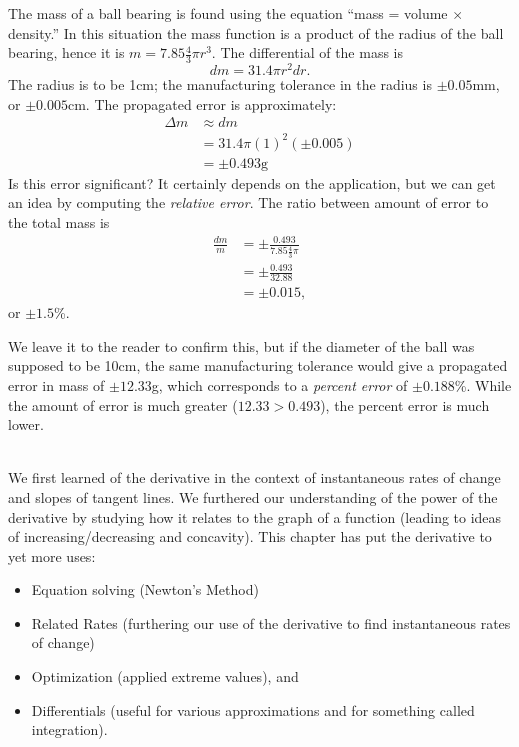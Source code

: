 {The mass of a ball bearing is found using the equation ``mass = volume $\times$ density.'' In this situation the mass function is a product of the radius of the ball bearing, hence it is $m = 7.85\frac43\pi r^3$. The differential of the mass is $$dm = 31.4\pi r^2 dr.$$ The radius is to be 1cm; the manufacturing tolerance in the radius is $\pm 0.05$mm, or $\pm 0.005$cm. The propagated error is approximately:
\begin{align*}
\Delta m & \approx dm \\
				&= 31.4\pi (1)^2 (\pm 0.005) \\
				&= \pm 0.493\text{g}
\end{align*}
Is this error significant? It certainly depends on the application, but we can get an idea by computing the \textit{relative error}. The ratio between amount of error to the total mass is
\begin{align*}
\frac{dm}{m} &= \pm \frac{0.493}{7.85\frac43\pi} \\
							&=\pm \frac{0.493}{32.88}\\
							&=\pm 0.015,
\end{align*}
or $\pm 1.5$\%. 

\enlargethispage{\baselineskip}

We leave it to the reader to confirm this, but if the diameter of the ball was supposed to be 10cm, the same manufacturing tolerance would give a propagated error in mass of $\pm12.33$g, which corresponds to a \textit{percent error} of $\pm0.188$\%. While the amount of error is much greater ($12.33 > 0.493$), the percent error is much lower.
}\\

We first learned of the derivative in the context of instantaneous rates of change and slopes of tangent lines. We furthered our understanding of the power of the derivative by studying how it relates to the graph of a function (leading to ideas of increasing/decreasing and concavity). This chapter has put the derivative to yet more uses:
\begin{itemize}
\item Equation solving (Newton's Method)
\item	Related Rates (furthering our use of the derivative to find instantaneous rates of change)
\item	Optimization (applied extreme values), and
\item	Differentials (useful for various approximations and for something called integration).
\end{itemize}

